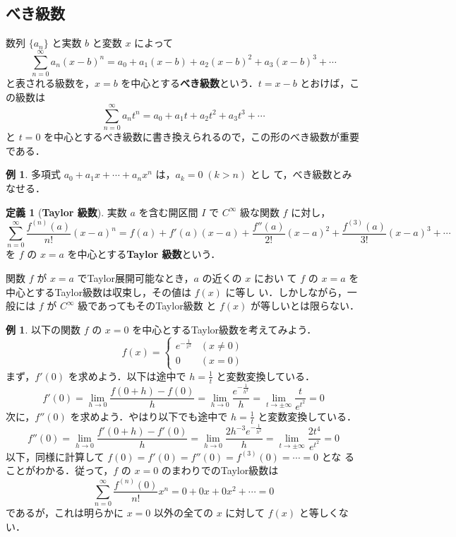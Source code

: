 \documentclass[10pt, uplatex, dvipdfmx]{jsarticle}
\theoremstyle{definition}
\newtheorem*{definition}{定義}
\newtheorem{example}[theorem]{例}
\numberwithin{equation}{section}
\begin{document}
\newpage
\subsection{べき級数}

数列 $\{a_n\}$ と実数 $b$ と変数 $x$ によって
\[
  \sum_{n=0}^{\infty} a_n(x-b)^n = a_0 + a_1(x-b) + a_2(x-b)^2 + a_3(x-b)^3 + \cdots
\]
と表される級数を，$x=b$ を中心とする\textbf{べき級数}という．$t=x-b$ とおけば，この級数は
\[
  \sum_{n=0}^{\infty} a_n t^n = a_0 + a_1 t + a_2 t^2 + a_3 t^3  + \cdots
\]
と $t=0$ を中心とするべき級数に書き換えられるので，この形のべき級数が重要である．

\begin{example}
  多項式 $a_0 + a_1 x + \cdots +a_n x^n$ は，$a_{k} = 0 \; (k >n)$ とし
  て，べき級数とみなせる．
\end{example}

\begin{definition}[\textbf{Taylor 級数}]
  実数 $a$ を含む開区間 $I$ で $C^{\infty}$ 級な関数 $f$ に対し，
  \[
    \sum_{n=0}^{\infty} \frac{f^{(n)}(a)}{n!}(x-a)^n = f(a) + f'(a)(x-a) + \frac{f''(a)}{2!}(x-a)^2
    + \frac{f^{(3)}(a)}{3!}(x-a)^3 + \cdots
  \]
  を $f$ の $x=a$ を中心とする\textbf{Taylor 級数}という．
\end{definition}

関数 $f$ が $x=a$ でTaylor展開可能なとき，$a$ の近くの $x$ におい
て $f$ の $x=a$ を中心とするTaylor級数は収束し，その値は $f(x)$ に等し
い．しかしながら，一般には $f$ が $C^{\infty}$ 級であってもそのTaylor級数
と $f(x)$ が等しいとは限らない．

\begin{example}
  以下の関数 $f$ の $x=0$ を中心とするTaylor級数を考えてみよう．
  \[
    f(x) =\left\{
      \begin{array}{cc}
        e^{-\frac{1}{x^2}} & (x \neq 0)\\
        0 & (x=0)
      \end{array}
    \right.
  \]
  まず，$f'(0)$ を求めよう．以下は途中で $h=\frac{1}{t}$ と変数変換している．
  \[
    f'(0)=\lim_{h \to 0} \frac{f(0+h)-f(0)}{h} = \lim_{h \to 0} \frac{e^{-\frac{1}{h^2}}}{h}
    = \lim_{t \to \pm \infty} \frac{t}{e^{t^2}} = 0
  \]
  次に，$f''(0)$ を求めよう．やはり以下でも途中で $h=\frac{1}{t}$ と変数変換している．
  \[
    f''(0) = \lim_{h \to 0} \frac{f'(0+h)-f'(0)}{h} = \lim_{h \to 0} \frac{2h^{-3}e^{-\frac{1}{h^2}}}{h}
    =\lim_{t \to \pm \infty} \frac{2t^4}{e^{t^2}} =0
  \]
  以下，同様に計算して $f(0)=f'(0)=f''(0)= f^{(3)}(0)= \cdots = 0$ とな
  ることがわかる．従って，$f$ の $x=0$ のまわりでのTaylor級数は
  \[
    \sum_{n=0}^{\infty} \frac{f^{(n)}(0)}{n!}x^n = 0 + 0x + 0x^2 + \cdots = 0
  \]
  であるが，これは明らかに $x=0$ 以外の全ての $x$ に対して $f(x)$ と等しくない．
\end{example}
\end{document}
